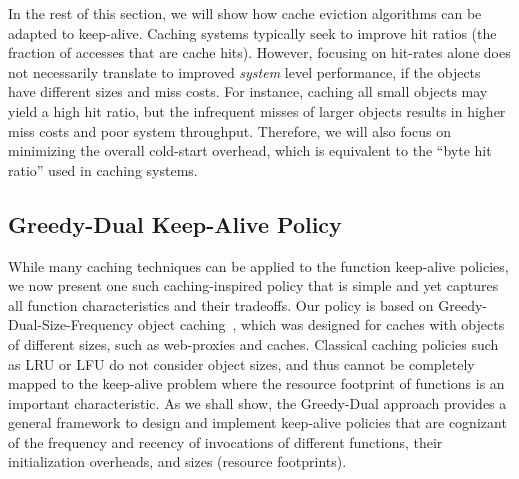 In the rest of this section, we will show how cache eviction algorithms can be adapted to keep-alive.
Caching systems typically seek to improve hit ratios (the fraction of accesses that are cache hits).
However, focusing on hit-rates alone does not necessarily translate to improved \emph{system} level performance, if the objects have different sizes and miss costs.
For instance, caching all small objects may yield a high hit ratio, but the infrequent misses of larger objects results in higher miss costs and poor system throughput. 
Therefore, we will also focus on minimizing the overall cold-start overhead, which is equivalent to the ``byte hit ratio'' used in caching systems.







\subsection{Greedy-Dual Keep-Alive Policy}
\label{subsec:gdsf}
\vspace*{\subsecspace}

While many caching techniques can be applied to the function keep-alive policies, we now present one such caching-inspired policy that is simple and yet captures all function characteristics and their tradeoffs.
Our policy is based on Greedy-Dual-Size-Frequency object caching~\cite{gdsf}, which was designed for caches with objects of  different sizes, such as web-proxies and caches. 
Classical caching policies such as LRU or LFU do not consider object sizes, and thus cannot be completely mapped to the keep-alive problem where the resource footprint of functions is an important characteristic. 
As we shall show, the Greedy-Dual approach provides a general framework to design and implement keep-alive policies that are cognizant of the  frequency and recency of invocations of different functions, their initialization overheads, and sizes (resource footprints). 



